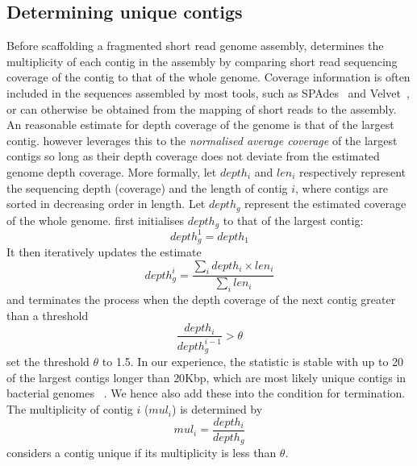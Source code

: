 \subsection{Determining unique contigs}
Before scaffolding a fragmented short read genome assembly, \npscarf{}
determines the multiplicity of each contig in the assembly by comparing short
read sequencing coverage of the contig to that of the whole genome. Coverage
information is often included in the sequences assembled by most tools, such as
SPAdes~\cite{BankevichNA2012} and Velvet~\cite{Zerbino2008}, or can otherwise 
be obtained from the mapping of short reads to the assembly. 
An reasonable estimate for depth coverage of the genome is that of the largest
contig. \npscarf{} however leverages this to the \emph{normalised average
coverage} of the largest contigs so long as their depth coverage does not
deviate from the estimated genome depth coverage.
More formally, let $depth_i$ and $len_i$ respectively represent the sequencing
depth (coverage) and the length of contig $i$, where contigs are sorted in
decreasing order in length. Let $depth_g$ represent the estimated coverage
of the whole genome. \npscarf{} first initialises $depth_g$ to that of the
largest contig:
\begin{equation}\label{E:depth}
depth_g^1 = depth_1
\end{equation}
It then iteratively updates the estimate   
\begin{equation}\label{E:gdepth}
depth_g^i = \dfrac{\sum_i depth_i \times len_i}{\sum_i len_i} 
\end{equation}
and terminates the process when the depth coverage of the next contig greater
than a threshold
\begin{equation}\label{E:cov}
\dfrac{depth_i}{depth_g^{i-1}} > \theta
\end{equation}
\npscarf{} set the threshold $\theta$ to 1.5. In our experience, the statistic is
stable with up to 20 of the largest contigs longer than $20$Kbp, which are most
likely unique contigs in bacterial genomes ~\cite{KorenP2015}. We hence also
add these into the condition for termination.
The multiplicity of contig $i$ ($mul_i$) is determined by
\begin{equation}\label{E:mul}
mul_i= \dfrac{depth_i}{depth_g}
\end{equation}
\npscarf{} considers a contig unique if its multiplicity is less than $\theta$.
 

